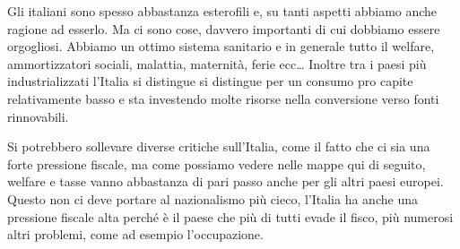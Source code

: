 \documentclass[12pt]{book} %
\begin{document}
Gli italiani sono spesso abbastanza esterofili e, su tanti aspetti abbiamo anche ragione ad esserlo. Ma ci sono cose, davvero
importanti di cui dobbiamo essere orgogliosi. Abbiamo un ottimo sistema sanitario e in generale tutto il
welfare, ammortizzatori
sociali, malattia, maternità, ferie ecc… Inoltre tra i paesi più industrializzati l'Italia si distingue si distingue per un consumo pro capite relativamente basso e sta investendo molte risorse nella conversione verso fonti rinnovabili.

Si potrebbero sollevare diverse critiche sull'Italia, come il fatto che ci sia una forte pressione
fiscale, ma come possiamo vedere nelle mappe qui di seguito, welfare e tasse vanno abbastanza di pari passo anche per gli altri paesi europei. 
Questo non ci deve portare al nazionalismo più cieco, l'Italia ha anche una pressione fiscale alta perché è il paese che più di tutti evade il fisco, più numerosi altri problemi, come ad esempio l'occupazione.
\end{document}

